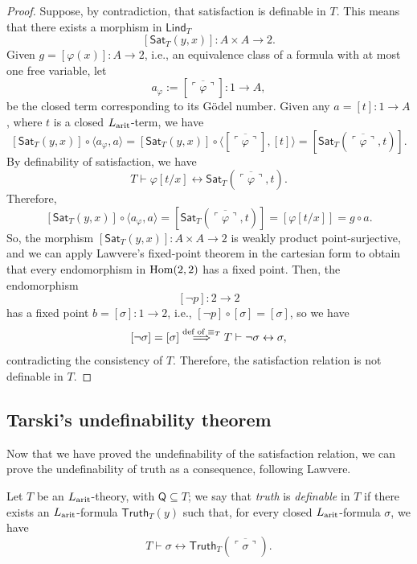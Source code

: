 \begin{proof}
    Suppose, by contradiction, that satisfaction is definable in $T$. This means that there exists a morphism in $\mathsf{Lind}_T$
    \[ [\mathsf{Sat}_T(y,x)] : A\times A \to 2. \]
    Given $g = [\varphi(x)] : A \to 2$, i.e., an equivalence class of a formula with at most one free variable, let
    \[ a_\varphi := [\overline{\ulcorner\varphi\urcorner}] : 1 \to A, \]
    be the closed term corresponding to its Gödel number.
    Given any $a=[t]:1\to A$, where $t$ is a closed $L_{\textnormal{arit}}$-term, we have
    \[ [\mathsf{Sat}_T(y,x)]\circ\langle a_\varphi,a\rangle = [\mathsf{Sat}_T(y,x)] \circ \langle[\overline{\ulcorner \varphi \urcorner}], [t]\rangle = [\mathsf{Sat}_T(\overline{\ulcorner\varphi\urcorner},t)]. \]
    By definability of satisfaction, we have
    \[ T\vdash\varphi[t/x]\leftrightarrow\mathsf{Sat}_T(\overline{\ulcorner\varphi\urcorner},t). \]
    Therefore,
    \[ [\mathsf{Sat}_T(y,x)]\circ\langle a_\varphi,a\rangle = [\mathsf{Sat}_T(\overline{\ulcorner\varphi\urcorner},t)] = [\varphi[t/x]] = g\circ a. \]
    So, the morphism $[\mathsf{Sat}_T(y,x)] : A\times A \to 2$ is weakly product point-surjective, and we can apply Lawvere's fixed-point theorem in the cartesian form to obtain that every endomorphism
    in $\operatorname{Hom}(2,2)$ has a fixed point. Then, the endomorphism
    \[ [\neg p] : 2 \to 2 \]
    has a fixed point $b = [\sigma] : 1 \to 2$, i.e., $[\neg p] \circ [\sigma] = [\sigma]$, so we have
    \[ [\neg \sigma] = [\sigma] \overset{\textnormal{def of $\equiv_T$}}{\implies} T \vdash \neg \sigma \leftrightarrow \sigma, \]
    contradicting the consistency of $T$. Therefore, the satisfaction relation is not definable in $T$.
\end{proof}

\subsection*{Tarski's undefinability theorem}
Now that we have proved the undefinability of the satisfaction relation, we can prove the undefinability of truth as a consequence, following Lawvere.

\begin{definition}
    Let $T$ be an $L_{\textnormal{arit}}$-theory, with $\mathsf{Q}\subseteq T$; we say that \emph{truth} is \emph{definable} in $T$ if there exists an $L_{\textnormal{arit}}$-formula $\mathsf{Truth}_T(y)$ such that, for every closed $L_{\textnormal{arit}}$-formula $\sigma$, we have
    \[ T\vdash \sigma\leftrightarrow\mathsf{Truth}_T(\overline{\ulcorner\sigma\urcorner}). \]
\end{definition}

